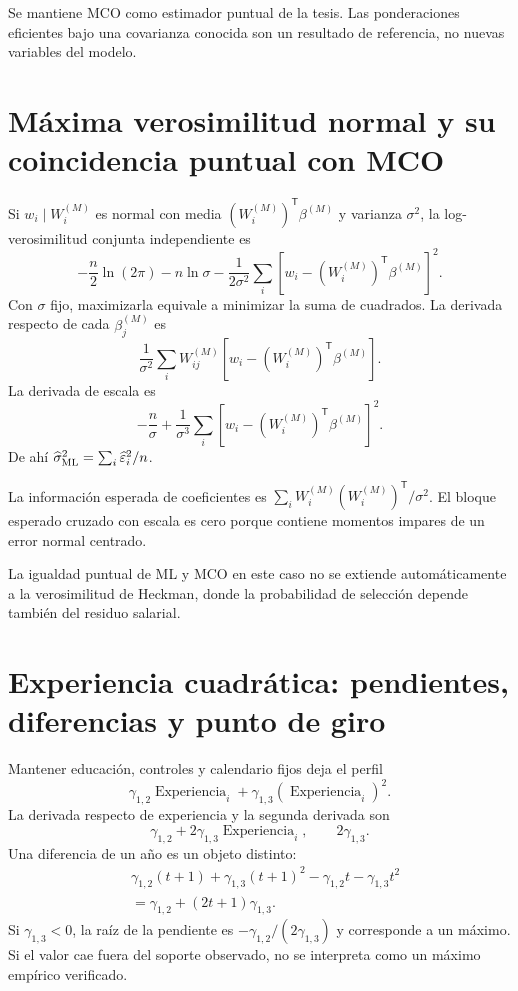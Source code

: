 \documentclass[11pt,a4paper]{article}
\begin{document}
Se mantiene MCO como estimador puntual de la tesis. Las ponderaciones eficientes bajo una covarianza conocida son un resultado de referencia, no nuevas variables del modelo.

\clearpage
\section{Máxima verosimilitud normal y su coincidencia puntual con MCO}

Si $w_i\mid W_i^{(M)}$ es normal con media $(W_i^{(M)})^{\mathsf T}\beta^{(M)}$ y varianza $\sigma^2$, la log-verosimilitud conjunta independiente es
\[
-\frac n2\ln(2\pi)-n\ln\sigma
-\frac1{2\sigma^2}\sum_i
[w_i-(W_i^{(M)})^{\mathsf T}\beta^{(M)}]^2.
\]
Con $\sigma$ fijo, maximizarla equivale a minimizar la suma de cuadrados. La derivada respecto de cada $\beta_j^{(M)}$ es
\[
\frac1{\sigma^2}\sum_iW_{ij}^{(M)}
[w_i-(W_i^{(M)})^{\mathsf T}\beta^{(M)}].
\]
La derivada de escala es
\[
-\frac n\sigma+\frac1{\sigma^3}
\sum_i[w_i-(W_i^{(M)})^{\mathsf T}\beta^{(M)}]^2.
\]
De ahí $\widehat\sigma^2_{\rm ML}=\sum_i\widehat\varepsilon_i^2/n$.

La información esperada de coeficientes es
$\sum_iW_i^{(M)}(W_i^{(M)})^{\mathsf T}/\sigma^2$.
El bloque esperado cruzado con escala es cero porque contiene momentos impares de un error normal centrado.

La igualdad puntual de ML y MCO en este caso no se extiende automáticamente a la verosimilitud de Heckman, donde la probabilidad de selección depende también del residuo salarial.

\clearpage
\section{Experiencia cuadrática: pendientes, diferencias y punto de giro}

Mantener educación, controles y calendario fijos deja el perfil
\[
\gamma_{1,2}\operatorname{Experiencia}_i
+\gamma_{1,3}(\operatorname{Experiencia}_i)^2.
\]
La derivada respecto de experiencia y la segunda derivada son
\[
\gamma_{1,2}+2\gamma_{1,3}\operatorname{Experiencia}_i,
\qquad 2\gamma_{1,3}.
\]
Una diferencia de un año es un objeto distinto:
\[
\begin{aligned}
&\gamma_{1,2}(t+1)+\gamma_{1,3}(t+1)^2
-\gamma_{1,2}t-\gamma_{1,3}t^2\\
&=\gamma_{1,2}+(2t+1)\gamma_{1,3}.
\end{aligned}
\]
Si $\gamma_{1,3}<0$, la raíz de la pendiente es
$-\gamma_{1,2}/(2\gamma_{1,3})$ y corresponde a un máximo. Si el valor cae fuera del soporte observado, no se interpreta como un máximo empírico verificado.
\end{document}
